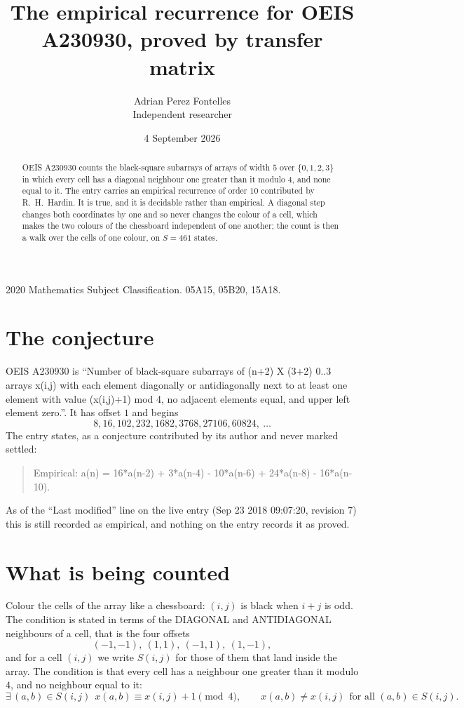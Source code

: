 \documentclass[11pt,a4paper]{article}
\title{The empirical recurrence for OEIS A230930, proved by transfer matrix}
\author{Adrian Perez Fontelles\\ \small Independent researcher}
\date{4 September 2026}
\theoremstyle{plain}
\theoremstyle{definition}
\begin{document}
\maketitle

\begin{abstract}
OEIS A230930 counts the black-square subarrays of arrays of width $5$ over $\{0,1,2,3\}$ in which
every cell has a diagonal neighbour one greater than it modulo 4, and none equal to it. The entry carries an empirical recurrence of order $10$ contributed by
R.~H.~Hardin. It is true, and it is decidable rather than empirical. A diagonal step changes
both coordinates by one and so never changes the colour of a cell, which makes the two colours
of the chessboard independent of one another; the count is then a walk over the cells of one
colour, on $S=461$ states.
\end{abstract}

\noindent\small 2020 Mathematics Subject Classification. 05A15, 05B20, 15A18.\normalsize

\section{The conjecture}

OEIS A230930 is ``Number of black-square subarrays of (n+2) X (3+2) 0..3 arrays x(i,j) with each element diagonally or antidiagonally next to at least one element with value (x(i,j)+1) mod 4, no adjacent elements equal, and upper left element zero.''. It has offset $1$ and begins
\[
8, 16, 102, 232, 1682, 3768, 27106, 60824,\ \dots
\]
The entry states, as a conjecture contributed by its author and never marked settled:
\begin{quote}
Empirical: a(n) = 16*a(n-2) + 3*a(n-4) - 10*a(n-6) + 24*a(n-8) - 16*a(n-10).
\end{quote}
As of the ``Last modified'' line on the live entry (Sep 23 2018 09:07:20, revision 7) this is still
recorded as empirical, and nothing on the entry records it as proved.

\section{What is being counted}

Colour the cells of the array like a chessboard: $(i,j)$ is black when $i+j$ is odd. The
condition is stated in terms of the DIAGONAL and ANTIDIAGONAL neighbours of a cell, that is the
four offsets
\[
(-1,-1),\ (1,1),\ (-1,1),\ (1,-1),
\]
and for a cell $(i,j)$ we write $S(i,j)$ for those of them that land inside the array. The
condition is that every cell has a neighbour one greater than it modulo $4$, and no neighbour equal to it:
\[
\exists\,(a,b)\in S(i,j)\ \ x(a,b)\equiv x(i,j)+1 \!\!\pmod{4},\qquad x(a,b)\neq x(i,j)\ \ \text{for all }(a,b)\in S(i,j).
\]
\end{document}
